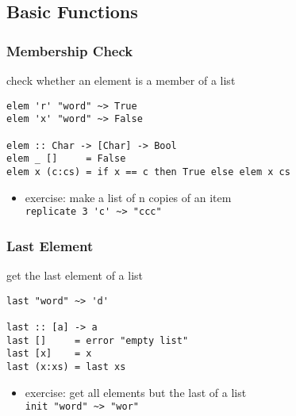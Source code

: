 \documentclass[dvipsnames]{beamer}
\theoremstyle{plain}
\begin{document}
\subsection{Basic Functions}

\begin{frame}[fragile]
  \frametitle{Membership Check}

  \begin{exampleblock}{check whether an element is a member of a list}
    \begin{lstlisting}
elem 'r' "word" ~> True
elem 'x' "word" ~> False

elem :: Char -> [Char] -> Bool
elem _ []     = False
elem x (c:cs) = if x == c then True else elem x cs
    \end{lstlisting}
  \end{exampleblock}

  \pause
  \begin{itemize}
    \item exercise: make a list of n copies of an item\\
      \lstinline{replicate 3 'c' ~> "ccc"}
  \end{itemize}
\end{frame}

\begin{frame}[fragile]
  \frametitle{Last Element}

  \begin{exampleblock}{get the last element of a list}
    \begin{lstlisting}
last "word" ~> 'd'

last :: [a] -> a
last []     = error "empty list"
last [x]    = x
last (x:xs) = last xs
    \end{lstlisting}
  \end{exampleblock}

  \pause
  \begin{itemize}
    \item exercise: get all elements but the last of a list\\
      \lstinline{init "word" ~> "wor"}
  \end{itemize}
\end{frame}
\end{document}
